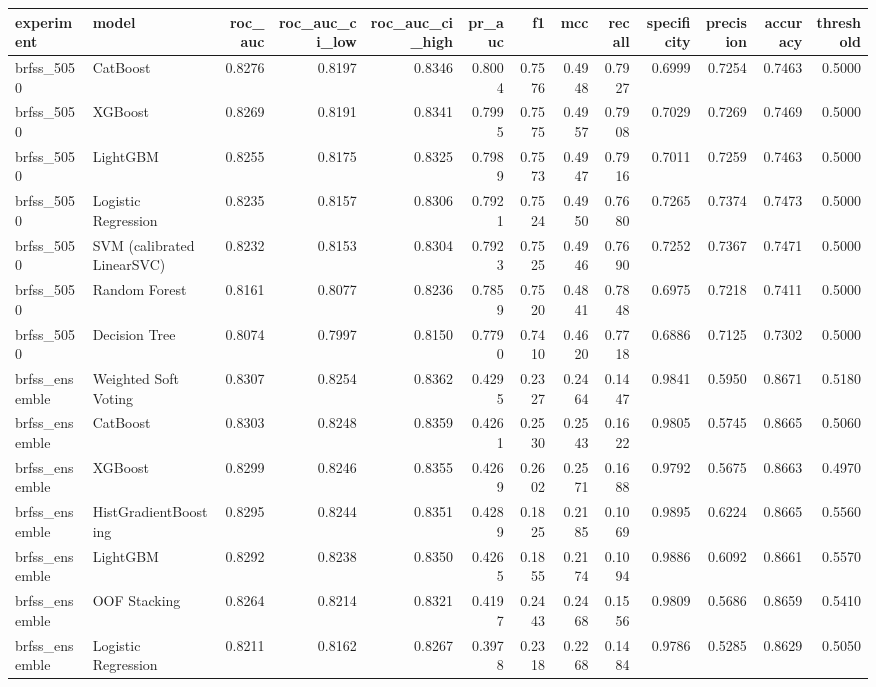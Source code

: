 \begin{tabular}{llrrrrrrrrrrr}
\toprule
experiment & model & roc\_auc & roc\_auc\_ci\_low & roc\_auc\_ci\_high & pr\_auc & f1 & mcc & recall & specificity & precision & accuracy & threshold \\
\midrule
brfss\_5050 & CatBoost & 0.8276 & 0.8197 & 0.8346 & 0.8004 & 0.7576 & 0.4948 & 0.7927 & 0.6999 & 0.7254 & 0.7463 & 0.5000 \\
brfss\_5050 & XGBoost & 0.8269 & 0.8191 & 0.8341 & 0.7995 & 0.7575 & 0.4957 & 0.7908 & 0.7029 & 0.7269 & 0.7469 & 0.5000 \\
brfss\_5050 & LightGBM & 0.8255 & 0.8175 & 0.8325 & 0.7989 & 0.7573 & 0.4947 & 0.7916 & 0.7011 & 0.7259 & 0.7463 & 0.5000 \\
brfss\_5050 & Logistic Regression & 0.8235 & 0.8157 & 0.8306 & 0.7921 & 0.7524 & 0.4950 & 0.7680 & 0.7265 & 0.7374 & 0.7473 & 0.5000 \\
brfss\_5050 & SVM (calibrated LinearSVC) & 0.8232 & 0.8153 & 0.8304 & 0.7923 & 0.7525 & 0.4946 & 0.7690 & 0.7252 & 0.7367 & 0.7471 & 0.5000 \\
brfss\_5050 & Random Forest & 0.8161 & 0.8077 & 0.8236 & 0.7859 & 0.7520 & 0.4841 & 0.7848 & 0.6975 & 0.7218 & 0.7411 & 0.5000 \\
brfss\_5050 & Decision Tree & 0.8074 & 0.7997 & 0.8150 & 0.7790 & 0.7410 & 0.4620 & 0.7718 & 0.6886 & 0.7125 & 0.7302 & 0.5000 \\
brfss\_ensemble & Weighted Soft Voting & 0.8307 & 0.8254 & 0.8362 & 0.4295 & 0.2327 & 0.2464 & 0.1447 & 0.9841 & 0.5950 & 0.8671 & 0.5180 \\
brfss\_ensemble & CatBoost & 0.8303 & 0.8248 & 0.8359 & 0.4261 & 0.2530 & 0.2543 & 0.1622 & 0.9805 & 0.5745 & 0.8665 & 0.5060 \\
brfss\_ensemble & XGBoost & 0.8299 & 0.8246 & 0.8355 & 0.4269 & 0.2602 & 0.2571 & 0.1688 & 0.9792 & 0.5675 & 0.8663 & 0.4970 \\
brfss\_ensemble & HistGradientBoosting & 0.8295 & 0.8244 & 0.8351 & 0.4289 & 0.1825 & 0.2185 & 0.1069 & 0.9895 & 0.6224 & 0.8665 & 0.5560 \\
brfss\_ensemble & LightGBM & 0.8292 & 0.8238 & 0.8350 & 0.4265 & 0.1855 & 0.2174 & 0.1094 & 0.9886 & 0.6092 & 0.8661 & 0.5570 \\
brfss\_ensemble & OOF Stacking & 0.8264 & 0.8214 & 0.8321 & 0.4197 & 0.2443 & 0.2468 & 0.1556 & 0.9809 & 0.5686 & 0.8659 & 0.5410 \\
brfss\_ensemble & Logistic Regression & 0.8211 & 0.8162 & 0.8267 & 0.3978 & 0.2318 & 0.2268 & 0.1484 & 0.9786 & 0.5285 & 0.8629 & 0.5050 \\

\end{tabular}
